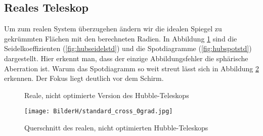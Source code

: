 \documentclass[twoside,colorback,accentcolor=tud4c,11pt]{tudreport}
\begin{document}
\subsection{Reales Teleskop}
Um zum realen System überzugehen ändern wir die idealen Spiegel zu gekrümmten Flächen mit den berechneten Radien. In Abbildung \ref{fig:hubstd} sind die Seidelkoeffizienten (\ref{fig:hubseidelstd}) und die Spotdiagramme (\ref{fig:hubspotstd}) dargestellt. Hier erkennt man, dass der einzige Abbildungsfehler die sphärische Aberration ist. Warum das Spotdiagramm so weit streut lässt sich in Abbildung \ref{fig:hubcrossstd} erkennen. Der Fokus liegt deutlich vor dem Schirm.
\begin{figure}[H]
\centering
  \quad
  \quad   
  \caption{Reale, nicht optimierte Version des Hubble-Teleskops}
  \label{fig:hubstd}
  
\end{figure}
\begin{figure}[H]
\centering
   	\begin{minipage}[b]{\textwidth}
   	\texttt{[image: BilderH/standard\_cross\_0grad.jpg]}
   	\caption{Querschnitt des realen, nicht optimierten Hubble-Teleskops}
  	\label{fig:hubcrossstd}
   	\end{minipage}
\end{figure}
\end{document}
